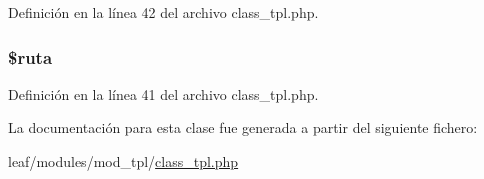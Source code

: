 Definición en la línea 42 del archivo class\-\_\-tpl.\-php.

\hypertarget{classtpl_ac305f4e1c69e186235154667ca03d8ff}{
\subsubsection[{\$ruta}]{\setlength{\rightskip}{0pt plus 5cm}\$ruta\hspace{0.3cm}{\ttfamily [private]}}}\label{classtpl_ac305f4e1c69e186235154667ca03d8ff}


Definición en la línea 41 del archivo class\-\_\-tpl.\-php.



La documentación para esta clase fue generada a partir del siguiente fichero\-:\begin{DoxyCompactItemize}
\item 
leaf/modules/mod\-\_\-tpl/\hyperlink{class__tpl_8php}{class\-\_\-tpl.\-php}\end{DoxyCompactItemize}

